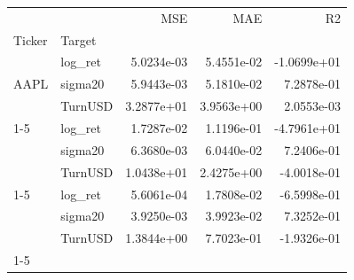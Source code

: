 \begin{tabular}{llrrr}
\toprule
 &  & MSE & MAE & R2 \\
Ticker & Target &  &  &  \\
\midrule
\multirow[t]{3}{*}{AAPL} & log_ret & 5.0234e-03 & 5.4551e-02 & -1.0699e+01 \\
 & sigma20 & 5.9443e-03 & 5.1810e-02 & 7.2878e-01 \\
 & TurnUSD & 3.2877e+01 & 3.9563e+00 & 2.0553e-03 \\
\cline{1-5}
\multirow[t]{3}{*}{MSFT} & log_ret & 1.7287e-02 & 1.1196e-01 & -4.7961e+01 \\
 & sigma20 & 6.3680e-03 & 6.0440e-02 & 7.2406e-01 \\
 & TurnUSD & 1.0438e+01 & 2.4275e+00 & -4.0018e-01 \\
\cline{1-5}
\multirow[t]{3}{*}{GOOG} & log_ret & 5.6061e-04 & 1.7808e-02 & -6.5998e-01 \\
 & sigma20 & 3.9250e-03 & 3.9923e-02 & 7.3252e-01 \\
 & TurnUSD & 1.3844e+00 & 7.7023e-01 & -1.9326e-01 \\
\cline{1-5}
\bottomrule
\end{tabular}
